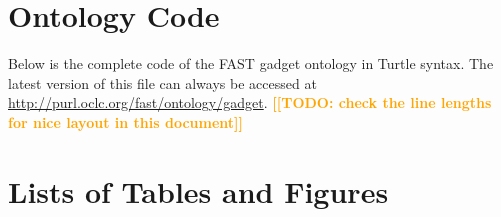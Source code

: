 \documentclass[twoside]{fast_latex}
\newcommand{\todo}[1]{\textsf{\textbf{\textcolor{Orange}{[[TODO: #1]]}}}}
\newcommand{\todo}[1]{}
\begin{document}
\section{Ontology Code}
\label{sec:ontology_code}

Below is the complete code of the FAST gadget ontology in Turtle syntax. The latest version of this file can always be accessed at \url{http://purl.oclc.org/fast/ontology/gadget}.
\todo{check the line lengths for nice layout in this document}

\singlespacing
% 



\clearpage
\doublespacing
{}
\section*{Lists of Tables and Figures}

\listoftables
\listoffigures

\clearpage
{}


\end{document}
